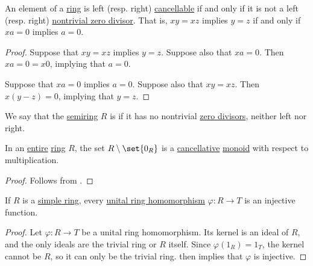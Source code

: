 \begin{proposition}\label{thm:semiring_cancellative_iff_no_zero_divisors}
  An element of a \hyperref[def:semiring]{ring} is left (resp. right) \hyperref[def:magma/cancellative]{cancellable} if and only if it is not a left (resp. right) \hyperref[def:divisibility/zero]{nontrivial zero divisor}. That is, \( xy = xz \) implies \( y = z \) if and only if \( xa = 0 \) implies \( a = 0 \).
\end{proposition}
\begin{proof}
  \SufficiencySubProof Suppose that \( xy = xz \) implies \( y = z \). Suppose also that \( xa = 0 \). Then \( xa = 0 = x0 \), implying that \( a = 0 \).

  \NecessitySubProof Suppose that \( xa = 0 \) implies \( a = 0 \). Suppose also that \( xy = xz \). Then \( x(y - z) = 0 \), implying that \( y = z \).
\end{proof}

\begin{definition}\label{def:entire_semiring}
  We say that the \hyperref[def:semiring]{semiring} \( R \) is  if it has no nontrivial \hyperref[def:divisibility]{zero divisors}, neither left nor right.
\end{definition}

\begin{proposition}\label{thm:ring_entire_iff_cancellative}
  In an \hyperref[def:entire_semiring]{entire} \hyperref[def:ring]{ring} \( R \), the set \( R \setminus \set{ 0_R } \) is a \hyperref[def:magma/cancellative]{cancellative} \hyperref[def:monoid]{monoid} with respect to multiplication.
\end{proposition}
\begin{proof}
  Follows from .
\end{proof}

\begin{proposition}\label{thm:simple_ring_homomorphism_is_injective}
  If \( R \) is a \hyperref[def:ring/simple]{simple ring}, every \hyperref[def:ring/homomorphism]{unital ring homomorphism} \( \varphi: R \to T \) is an injective function.
\end{proposition}
\begin{proof}
  Let \( \varphi: R \to T \) be a unital ring homomorphism. Its kernel is an ideal of \( R \), and the only ideals are the trivial ring or \( R \) itself. Since \( \varphi(1_R) = 1_T \), the kernel cannot be \( R \), so it can only be the trivial ring.  then implies that \( \varphi \) is injective.
\end{proof}


